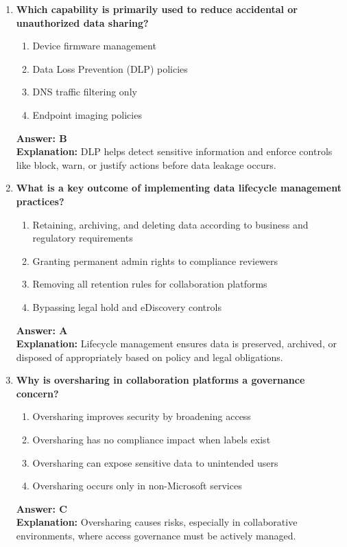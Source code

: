 \documentclass[10pt]{article}
\begin{document}
\begin{enumerate}[leftmargin=*]
\item \textbf{Which capability is primarily used to reduce accidental or unauthorized data sharing?}
\begin{enumerate}[label=\Alph*.]
  \item Device firmware management
  \item Data Loss Prevention (DLP) policies
  \item DNS traffic filtering only
  \item Endpoint imaging policies
\end{enumerate}
\textbf{Answer: B}\\
\textbf{Explanation:} DLP helps detect sensitive information and enforce controls like block, warn, or justify actions before data leakage occurs.

\item \textbf{What is a key outcome of implementing data lifecycle management practices?}
\begin{enumerate}[label=\Alph*.]
  \item Retaining, archiving, and deleting data according to business and regulatory requirements
  \item Granting permanent admin rights to compliance reviewers
  \item Removing all retention rules for collaboration platforms
  \item Bypassing legal hold and eDiscovery controls
\end{enumerate}
\textbf{Answer: A}\\
\textbf{Explanation:} Lifecycle management ensures data is preserved, archived, or disposed of appropriately based on policy and legal obligations.

\item \textbf{Why is oversharing in collaboration platforms a governance concern?}
\begin{enumerate}[label=\Alph*.]
  \item Oversharing improves security by broadening access
  \item Oversharing has no compliance impact when labels exist
  \item Oversharing can expose sensitive data to unintended users
  \item Oversharing occurs only in non-Microsoft services
\end{enumerate}
\textbf{Answer: C}\\
\textbf{Explanation:} Oversharing causes risks, especially in collaborative environments, where access governance must be actively managed.


\end{enumerate}
\end{document}
